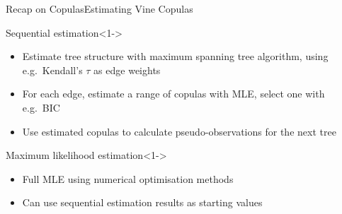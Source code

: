\begin{frame}{Recap on Copulas}{Estimating Vine Copulas}
  \begin{block}{Sequential estimation}<1->
    \begin{itemize}
    \item<2-> Estimate tree structure with maximum spanning tree algorithm, using e.g.\ Kendall's \(\tau\) as edge weights
    \item<3-> For each edge, estimate a range of copulas with MLE, select one with e.g.\ BIC
    \item<4-> Use estimated copulas to calculate pseudo-observations for the next tree
    \end{itemize}
  \end{block}

  \begin{block}{Maximum likelihood estimation}<1->
    \begin{itemize}
    \item<5-> Full MLE using numerical optimisation methods
    \item<6-> Can use sequential estimation results as starting values
    \end{itemize}
  \end{block}
\end{frame}

